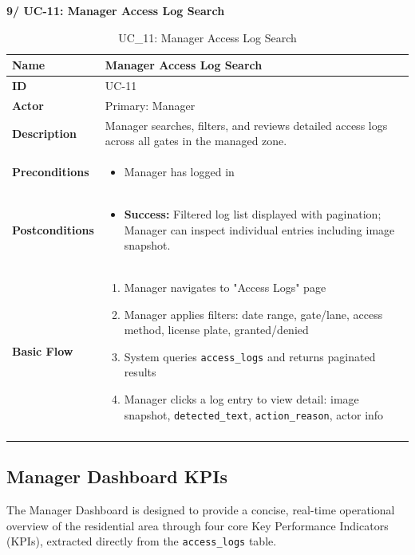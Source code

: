 \documentclass[a4paper]{article}
\newlength{\ucLeft}
\begin{document}
\newpage
\noindent \textbf{9/ UC-11: Manager Access Log Search}
\setlength{\tabcolsep}{6pt}
\renewcommand{\arraystretch}{1.2}
\setlength{\ucLeft}{30mm}

\begin{longtable}{|>{\bfseries}p{\ucLeft}|
                p{\dimexpr\textwidth-\ucLeft-4\tabcolsep-3\arrayrulewidth\relax}|}
\hline
Name & Manager Access Log Search \\ \hline
ID & UC-11 \\ \hline
Actor & Primary: Manager \\ \hline
Description & Manager searches, filters, and reviews detailed access logs across all gates in the managed zone.\\ \hline
Preconditions &
\begin{itemize}[leftmargin=*, nosep, topsep=0pt, partopsep=0pt, parsep=0pt]
    \item Manager has logged in
\end{itemize}
\\ \hline
Postconditions &
\begin{itemize}[leftmargin=*, nosep, topsep=0pt, partopsep=0pt, parsep=0pt, after=\strut]
    \item \textbf{Success:} Filtered log list displayed with pagination; Manager can inspect individual entries including image snapshot.
\end{itemize}
\\ \hline
Basic Flow & 
\begin{enumerate}[leftmargin=*, nosep, topsep=0pt, partopsep=0pt, parsep=0pt]
    \item Manager navigates to "Access Logs" page
    \item Manager applies filters: date range, gate/lane, access method, license plate, granted/denied
    \item System queries \texttt{access\_logs} and returns paginated results
    \item Manager clicks a log entry to view detail: image snapshot, \texttt{detected\_text}, \texttt{action\_reason}, actor info
\end{enumerate}
\\ \hline
\caption{UC\_11: Manager Access Log Search}\label{tab:uc11}
\end{longtable}

\newpage
\subsection{Manager Dashboard KPIs}
The Manager Dashboard is designed to provide a concise, real-time operational overview of the residential area through four core Key Performance Indicators (KPIs), extracted directly from the \texttt{access\_logs} table.
\end{document}
